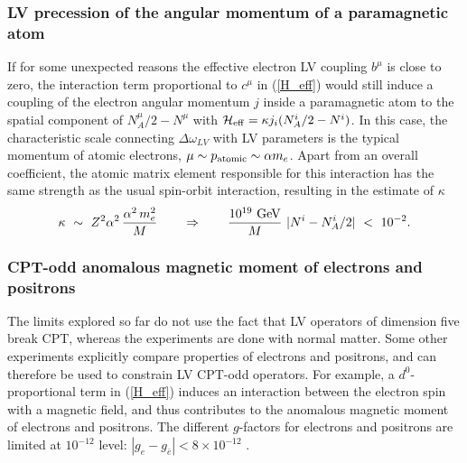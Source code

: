 \documentclass[12pt]{revtex4}
\begin{document}
\subsubsection*{LV precession of the angular momentum of a paramagnetic atom}

If for some unexpected reasons the effective electron LV coupling
$b^\mu$ is close to  zero, the interaction term proportional to
$c^\mu$ in (\ref{H_eff}) would still induce a coupling of the electron
angular momentum $j$ inside a paramagnetic atom to the spatial
component of   
$N_A^\mu/2-N^\mu$ with $\mathcal{H}_{\rm eff}= \kappa j_i (N^i_A/2-N^i) $. 
In this case, the characteristic scale connecting 
$\Delta \omega_{LV}$ with LV parameters is the typical momentum 
of atomic electrons, $\mu \sim p_{\rm atomic} \sim \alpha m_e$. 
Apart from an overall coefficient, the atomic matrix element
 responsible for this interaction has the same strength as the usual spin-orbit 
 interaction, resulting in the estimate of $\kappa$
%
 \begin{equation}
 \kappa ~\sim~ Z^2\alpha^2 \, \frac{\alpha^2 \, m_e^2}{M}
\qquad \Rightarrow \qquad
\frac {10^{19}~{\rm GeV}}{M} ~ |N^i-N_A^i/2|~<~10^{-2}.
 \label{N_limit_atom}
 \end{equation}
%


\subsubsection*{CPT-odd anomalous magnetic moment of electrons and positrons}


The limits explored so far do not use the fact that LV operators of
dimension five break CPT, whereas the experiments \cite{clock1,clock2} are
done with normal matter. Some other experiments explicitly compare
properties  of electrons and positrons, and can therefore be used 
to constrain LV CPT-odd operators. For example, a $ d^0 $-proportional
term in (\ref{H_eff}) induces an interaction between the electron spin
with a magnetic field, and thus contributes to the anomalous magnetic
moment of electrons and positrons. The different $g$-factors for
electrons and positrons are limited at $10^{-12}$ level: 
$|g_{e}-g_{\bar e}|< 8\times 10^{-12}$ \cite{Mittleman:1999it}.  
\end{document}
